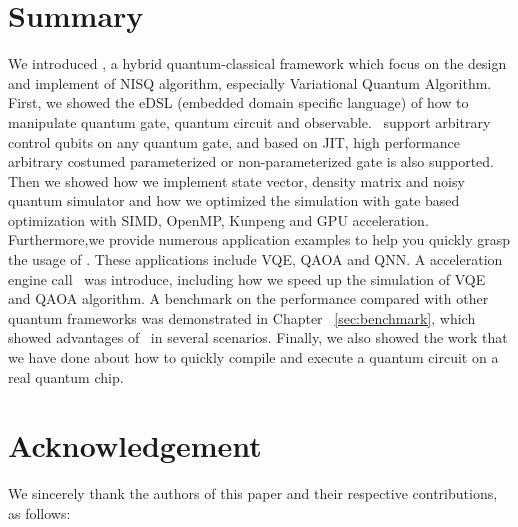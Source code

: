 \documentclass[pra,twocolumn,superscriptaddress,floatfix,nofootinbib,amsmath,amssymb]{revtex4-1}
\numberwithin{equation}{section}
\numberwithin{figure}{section}
\numberwithin{table}{section}
\begin{document}
% 

\section{Summary}
\label{sec:summary}
We introduced \MindQuantum, a hybrid quantum-classical framework which focus on the design and implement of NISQ algorithm, especially Variational Quantum Algorithm. First, we showed the eDSL (embedded domain specific language) of how to manipulate quantum gate, quantum circuit and observable. \MindQuantum\ support arbitrary control qubits on any quantum gate, and based on JIT, high performance arbitrary costumed parameterized or non-parameterized gate is also supported. Then we showed how we implement state vector, density matrix and noisy quantum simulator and how we optimized the simulation with gate based optimization with SIMD, OpenMP, Kunpeng and GPU acceleration. Furthermore,we provide numerous application examples to help you quickly grasp the usage of \MindQuantum. These applications include VQE, QAOA and QNN. A acceleration engine call \QuPack\ was introduce, including how we speed up the simulation of VQE and QAOA algorithm. A benchmark on the performance compared with other quantum frameworks was demonstrated in Chapter ~\ref{sec:benchmark}, which showed advantages of \MindQuantum\ in several scenarios. Finally, we also showed the work that we have done about how to quickly compile and execute a quantum circuit on a real quantum chip.

\section{Acknowledgement}
\label{sec:acknowledgement}
We sincerely thank the authors of this paper and their respective contributions, as follows:
\end{document}

